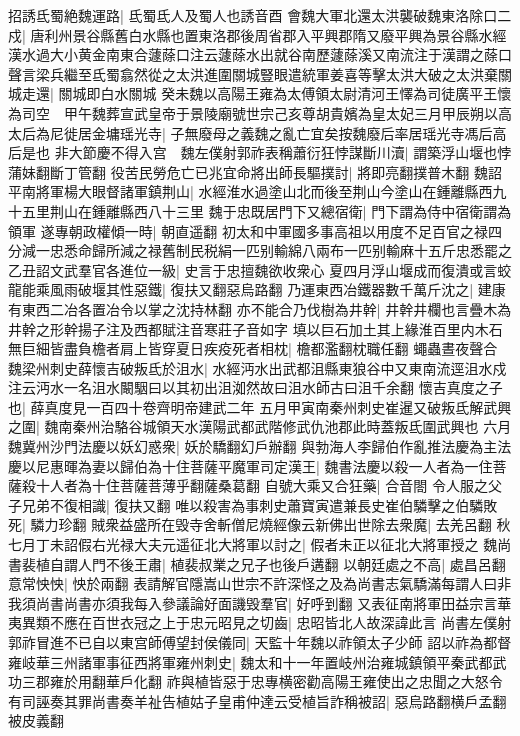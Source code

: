 招誘氐蜀絶魏運路|{
	氐蜀氐人及蜀人也誘音酉}
會魏大軍北還太洪襲破魏東洛除口二戍|{
	唐利州景谷縣舊白水縣也置東洛郡後周省郡入平興郡隋又廢平興為景谷縣水經漢水過大小黄金南東合蘧蒢口注云蘧蒢水出就谷南歷蘧蒢溪又南流注于漢謂之蒢口}
聲言梁兵繼至氐蜀翕然從之太洪進圍關城豎眼遣統軍姜喜等擊太洪大破之太洪棄關城走還|{
	關城即白水關城}
癸未魏以高陽王雍為太傅領太尉清河王懌為司徒廣平王懷為司空　甲午魏葬宣武皇帝于景陵廟號世宗己亥尊胡貴嬪為皇太妃三月甲辰朔以高太后為尼徙居金墉瑶光寺|{
	子無廢母之義魏之亂亡宜矣按魏廢后率居瑶光寺馮后高后是也}
非大節慶不得入宫　魏左僕射郭祚表稱蕭衍狂悖謀斷川瀆|{
	謂築浮山堰也悖蒲妹翻斷丁管翻}
役苦民勞危亡已兆宜命將出師長驅撲討|{
	將即亮翻撲普木翻}
魏詔平南將軍楊大眼督諸軍鎮荆山|{
	水經淮水過塗山北而後至荆山今塗山在鍾離縣西九十五里荆山在鍾離縣西八十三里}
魏于忠既居門下又總宿衛|{
	門下謂為侍中宿衛謂為領軍}
遂專朝政權傾一時|{
	朝直遥翻}
初太和中軍國多事高祖以用度不足百官之禄四分減一忠悉命歸所減之禄舊制民税絹一匹别輸綿八兩布一匹别輸麻十五斤忠悉罷之乙丑詔文武羣官各進位一級|{
	史言于忠擅魏欲收衆心}
夏四月浮山堰成而復潰或言蛟龍能乘風雨破堰其性惡鐵|{
	復扶又翻惡烏路翻}
乃運東西冶鐵器數千萬斤沈之|{
	建康有東西二冶各置冶令以掌之沈持林翻}
亦不能合乃伐樹為井幹|{
	井幹井欄也言疊木為井幹之形幹揚子注及西都賦注音寒莊子音如字}
填以巨石加土其上緣淮百里内木石無巨細皆盡負檐者肩上皆穿夏日疾疫死者相枕|{
	檐都濫翻枕職任翻}
蠅蟲晝夜聲合　魏梁州刺史薛懷吉破叛氐於沮水|{
	水經沔水出武都沮縣東狼谷中又東南流逕沮水戍注云沔水一名沮水闞駰曰以其初出沮洳然故曰沮水師古曰沮千余翻}
懷吉真度之子也|{
	薛真度見一百四十卷齊明帝建武二年}
五月甲寅南秦州刺史崔暹又破叛氐解武興之圍|{
	魏南秦州治駱谷城領天水漢陽武都武階修武仇池郡此時蓋叛氐圍武興也}
六月魏冀州沙門法慶以妖幻惑衆|{
	妖於驕翻幻戶辦翻}
與勃海人李歸伯作亂推法慶為主法慶以尼惠暉為妻以歸伯為十住菩薩平魔軍司定漢王|{
	魏書法慶以殺一人者為一住菩薩殺十人者為十住菩薩菩薄乎翻薩桑葛翻}
自號大乘又合狂藥|{
	合音閤}
令人服之父子兄弟不復相識|{
	復扶又翻}
唯以殺害為事刺史蕭寶寅遣兼長史崔伯驎擊之伯驎敗死|{
	驎力珍翻}
賊衆益盛所在毁寺舍斬僧尼燒經像云新佛出世除去衆魔|{
	去羌呂翻}
秋七月丁未詔假右光禄大夫元遥征北大將軍以討之|{
	假者未正以征北大將軍授之}
魏尚書裴植自謂人門不後王肅|{
	植裴叔業之兄子也後戶遘翻}
以朝廷處之不高|{
	處昌呂翻}
意常怏怏|{
	怏於兩翻}
表請解官隱嵩山世宗不許深怪之及為尚書志氣驕滿每謂人曰非我須尚書尚書亦須我每入參議論好面譏毁羣官|{
	好呼到翻}
又表征南將軍田益宗言華夷異類不應在百世衣冠之上于忠元昭見之切齒|{
	忠昭皆北人故深諱此言}
尚書左僕射郭祚冒進不已自以東宫師傅望封侯儀同|{
	天監十年魏以祚領太子少師}
詔以祚為都督雍岐華三州諸軍事征西將軍雍州刺史|{
	魏太和十一年置岐州治雍城鎮領平秦武都武功三郡雍於用翻華戶化翻}
祚與植皆惡于忠專横密勸高陽王雍使出之忠聞之大怒令有司誣奏其罪尚書奏羊祉告植姑子皇甫仲達云受植旨詐稱被詔|{
	惡烏路翻横戶孟翻被皮義翻}
